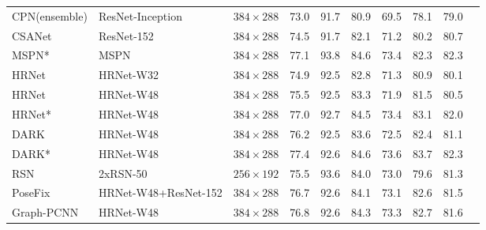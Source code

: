 \documentclass[final]{cvpr}
\begin{document}
\begin{table*}
\begin{center}
\begin{tabular}{l|l|c|lcccccc}
CPN(ensemble) \cite{CPN}          & ResNet-Inception &$384\times 288$&73.0                  & 91.7             & 80.9          & 69.5          &78.1           &79.0\\
CSANet \cite{CSANet}              & ResNet-152    &$384\times288$    &74.5                  & 91.7             & 82.1          & 71.2          &80.2           &80.7\\
MSPN* \cite{MSPN}                 & MSPN          &$384\times288$    &77.1                  & 93.8             & 84.6          & 73.4          &82.3           &82.3\\
HRNet \cite{HRNet}                & HRNet-W32     &$384\times288$    &74.9                  & 92.5             & 82.8          & 71.3          &80.9           &80.1\\
HRNet \cite{HRNet}                & HRNet-W48     &$384\times288$    &75.5                  & 92.5             & 83.3          & 71.9          &81.5           &80.5\\
HRNet* \cite{HRNet}               & HRNet-W48     &$384\times288$    &77.0                  & 92.7             & 84.5          & 73.4          &83.1           &82.0\\
DARK \cite{DARK}                  & HRNet-W48     &$384\times288$    &76.2                  & 92.5             & 83.6          & 72.5          &82.4           &81.1\\
DARK* \cite{DARK}                 & HRNet-W48     &$384\times288$    &77.4                  & 92.6             & 84.6          & 73.6          &83.7           &82.3\\
RSN \cite{RSN}                   & 2xRSN-50       &$256\times192$    &75.5                  & 93.6             & 84.0          & 73.0          &79.6           &81.3\\
PoseFix \cite{Posefix}    & HRNet-W48+ResNet-152    &$384\times288$  &76.7                  & 92.6             & 84.1          & 73.1          &82.6           &81.5\\
Graph-PCNN \cite{Graph-PCNN}      & HRNet-W48     &$384\times288$    &76.8                  & 92.6             & 84.3          & 73.3          &82.7           &81.6\\


\end{tabular}
\end{center}
\end{table*}
\end{document}
